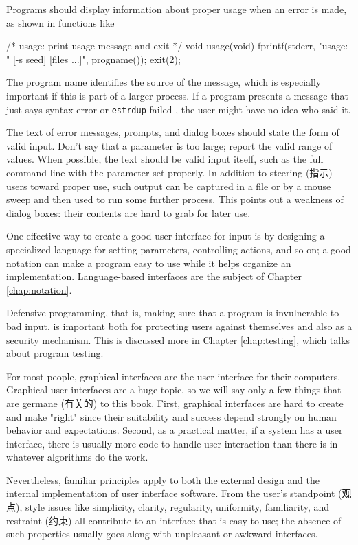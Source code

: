 Programs should display information about proper usage when an error is
made, as shown in functions like
\begin{wellcode}
    /* usage: print usage message and exit */
    void usage(void)
    {
        fprintf(stderr, "usage: %
            " [-s seed] [files ...]\n", progname());
        exit(2);
    }
\end{wellcode}

The program name identifies the source of the message, which is especially
important if this is part of a larger process. If a program presents a
message that just says syntax error or \verb'estrdup' failed , the user
might have no idea who said it.

The text of error messages, prompts, and dialog boxes should state the form
of valid input. Don't say that a parameter is too large; report the valid
range of values.  When possible, the text should be valid input itself,
such as the full command line with the parameter set properly. In addition
to steering (指示) users toward proper use, such output can be captured in
a file or by a mouse sweep and then used to run some further process. This
points out a weakness of dialog boxes: their contents are hard to grab for
later use.

One effective way to create a good user interface for input is by designing
a specialized language for setting parameters, controlling actions, and so
on; a good notation can make a program easy to use while it helps organize
an implementation.  Language-based interfaces are the subject of Chapter
\ref{chap:notation}.

Defensive programming, that is, making sure that a program is invulnerable
to bad input, is important both for protecting users against themselves and
also as a security mechanism. This is discussed more in Chapter
\ref{chap:testing}, which talks about program testing.

For most people, graphical interfaces are the user interface for their
computers.  Graphical user interfaces are a huge topic, so we will say only
a few things that are germane (有关的) to this book. First, graphical
interfaces are hard to create and make "right" since their suitability and
success depend strongly on human behavior and expectations. Second, as a
practical matter, if a system has a user interface, there is usually more
code to handle user interaction than there is in whatever algorithms do the
work.

Nevertheless, familiar principles apply to both the external design and the
internal implementation of user interface software. From the user's
standpoint (观点), style issues like simplicity, clarity, regularity,
uniformity, familiarity, and restraint (约束) all contribute to an
interface that is easy to use; the absence of such properties usually goes
along with unpleasant or awkward interfaces.

